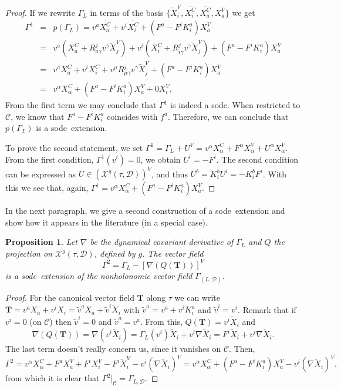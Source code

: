 \documentclass[11pt]{article}
\newtheorem{prop}{Proposition}
\def\sode{{\sc sode}}
\def\T{{\mathbf T}}
\def\D{{\mathcal D}}
\def\C{{\mathcal C}}
\begin{document}
\begin{proof}
If we rewrite $\Gamma_L$ in terms of the basis $\{\tilde{X}_i^V, \overline{X_i^C},\overline{X_a^C}, X_a^V\}$ we  get 
\begin{eqnarray*}
    \Gamma^1&=& p(\Gamma_L)= v^a\overline{X_a^C} +v^i\overline{X_i^C}+ (F^a-F^i K_i^a) X_a^V\\
    &=& v^a(X_a^C+R^j_{a\gamma}v^\gamma \tilde{X}_j^V) +v^i(X_i^C+R^j_{i\gamma}v^\gamma \tilde{X}_j^V)+ (F^a-F^i K_i^a) X_a^V\\
    &=& v^a X_a^C+v^i X_i^C+v^\mu R^j_{\mu\gamma}v^\gamma \tilde{X}_j^V+(F^a-F^i K^a_i)X_a^V\\
    &=& v^\alpha X_\alpha^C+(F^a-F^i K_i^a)X_a^V+0X_i^V.
\end{eqnarray*}
From the first term we may conclude that $\Gamma^1$ is indeed a \sode. When restricted to $\C$, we know that $F^a-F^i K_i^a$ coincides with $f^a$. Therefore, we can conclude that $p(\Gamma_L)$ is a \sode\ extension.

To prove the second statement, we set $\Gamma^1=\Gamma_L+U^V=v^\alpha X_\alpha^C+F^\alpha X_\alpha^V+U^\alpha X_\alpha^V$. From the first condition, $\Gamma^1(v^i)=0$, we obtain $U^i=-F^i$. The second condition can be  expressed as  $U\in({\mathcal X}^g(\tau,\D))^V$, and thus $ U^b=K^b_iU^i = - K^b_iF^i$. With this we see that, again,
$
\Gamma^1= v^\alpha X_\alpha^C+(F^a-F^i K_i^a)X_a^V.
$
\end{proof} 


In the next paragraph, we give a second construction of a \sode\ extension and show how it appears in the literature (in a special case).

\begin{prop}\label{prop2}
Let $\nabla$ be the dynamical covariant derivative of $\Gamma_L$ and $Q$ the projection on ${\mathcal X}^g(\tau,\D)$, defined by $g$. The vector field 
$$
\Gamma^2=\Gamma_L-[\nabla(Q(\T))]^V
$$
is a \sode\ extension of the nonholonomic vector field $\Gamma_{(L,\mathcal{D})}$.
\end{prop}

\begin{proof}
For the  canonical vector field $\T$ along $\tau$ we can write
$
\T= v^a X_a+v^i X_i = \tilde{v}^a X_a+\tilde{v}^i \tilde{X}_i
$
with $\tilde{v}^a=v^a+v^i  K^a_i$ and $\tilde{v}^i=v^i$. Remark that if $v^i=0$ (on $\mathcal{C}$) then $\tilde{v}^i=0$ and $\tilde{v}^a=v^a$. From this, $Q(\T) = v^i {\tilde X}_i$ and
\[
\nabla(Q(\T))=\nabla(v^i \tilde{X}_i) = \Gamma_L(v^i) \tilde{X}_i+v^i \nabla \tilde{X}_i= F^i \tilde{X}_i+v^i\nabla \tilde{X}_i.
\]
The last term doesn't really concern us,  since it vanishes on $\C$. Then,
\[
\Gamma^2 =v^\alpha X_\alpha^C+F^a X_a^V+F^i X_i^V-F^i \tilde{X}_i^V -v^i(\nabla \tilde{X}_i)^V =v^\alpha X_\alpha^C+(F^a -F^i K^a_i) X_a^V-v^i(\nabla \tilde{X}_i)^V,
\]
from which  it is clear that $\Gamma^2|_{\C}=\Gamma_{L,\D}$.
\end{proof}
\end{document}
